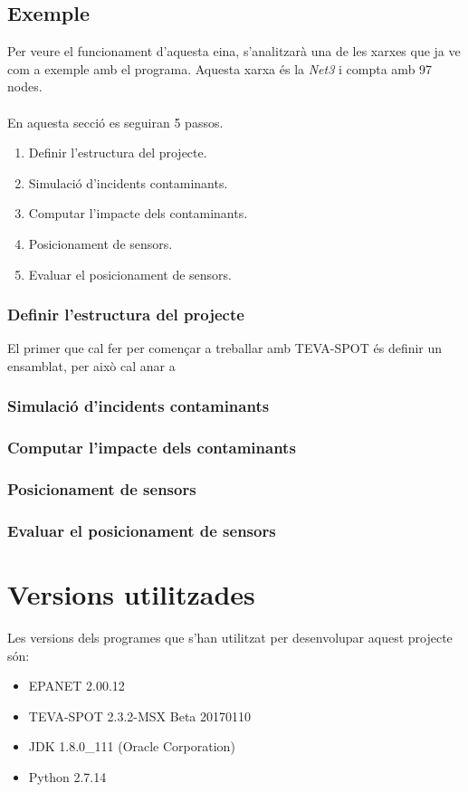 \documentclass[12pt]{article}
\begin{document}
\subsection{Exemple}
Per veure el funcionament d'aquesta eina, s'analitzarà una de les xarxes que ja ve com a exemple amb el programa. Aquesta xarxa és la \textit{Net3} i compta amb 97 nodes.
\\\\En aquesta secció es seguiran 5 passos.
\begin{enumerate}
	\item Definir l'estructura del projecte.
	\item Simulació d'incidents contaminants.
	\item Computar l'impacte dels contaminants.
	\item Posicionament de sensors.
	\item Evaluar el posicionament de sensors.
\end{enumerate}

\subsubsection{Definir l'estructura del projecte}
El primer que cal fer per començar a treballar amb TEVA-SPOT és definir un ensamblat, per això cal anar a 

\subsubsection{Simulació d'incidents contaminants}

\subsubsection{Computar l'impacte dels contaminants}

\subsubsection{Posicionament de sensors}

\subsubsection{Evaluar el posicionament de sensors}

\clearpage
\section{Versions utilitzades}
Les versions dels programes que s'han utilitzat per desenvolupar aquest projecte són:
\begin{itemize}
	\item EPANET 2.00.12
	\item TEVA-SPOT 2.3.2-MSX Beta 20170110
	\item JDK 1.8.0\_111 (Oracle Corporation)
	\item Python 2.7.14
\end{itemize}
\end{document}
